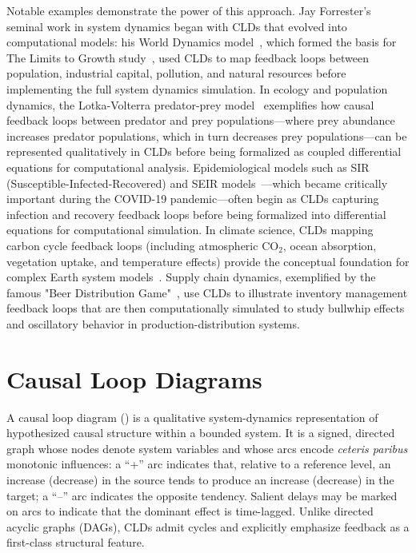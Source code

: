 \documentclass[12pt]{article}
\begin{document}
Notable examples demonstrate the power of this approach. Jay Forrester's seminal work in system dynamics began with CLDs that evolved into computational models: his World Dynamics model~\citep{forrester1971worlddynamics}, which formed the basis for The Limits to Growth study~\citep{meadows1972limits}, used CLDs to map feedback loops between population, industrial capital, pollution, and natural resources before implementing the full system dynamics simulation. In ecology and population dynamics, the Lotka-Volterra predator-prey model~\citep{lotka1925elements,volterra1928fluctuations} exemplifies how causal feedback loops between predator and prey populations—where prey abundance increases predator populations, which in turn decreases prey populations—can be represented qualitatively in CLDs before being formalized as coupled differential equations for computational analysis. Epidemiological models such as SIR (Susceptible-Infected-Recovered) and SEIR models~\citep{kermack1927sir}—which became critically important during the COVID-19 pandemic—often begin as CLDs capturing infection and recovery feedback loops before being formalized into differential equations for computational simulation. In climate science, CLDs mapping carbon cycle feedback loops (including atmospheric CO$_2$, ocean absorption, vegetation uptake, and temperature effects) provide the conceptual foundation for complex Earth system models~\citep{ipcc2021ar6wg1}. Supply chain dynamics, exemplified by the famous "Beer Distribution Game"~\citep{sterman1989misperceptions}, use CLDs to illustrate inventory management feedback loops that are then computationally simulated to study bullwhip effects and oscillatory behavior in production-distribution systems.

\section*{Causal Loop Diagrams}

A causal loop diagram (\CLD) is a qualitative system-dynamics representation of hypothesized causal structure within a bounded system. It is a signed, directed graph whose nodes denote system variables and whose arcs encode \emph{ceteris paribus} monotonic influences: a \enquote{+} arc indicates that, relative to a reference level, an increase (decrease) in the source tends to produce an increase (decrease) in the target; a \enquote{--} arc indicates the opposite tendency. Salient delays may be marked on arcs to indicate that the dominant effect is time-lagged. Unlike directed acyclic graphs (DAGs), CLDs admit cycles and explicitly emphasize feedback as a first-class structural feature.
\end{document}
